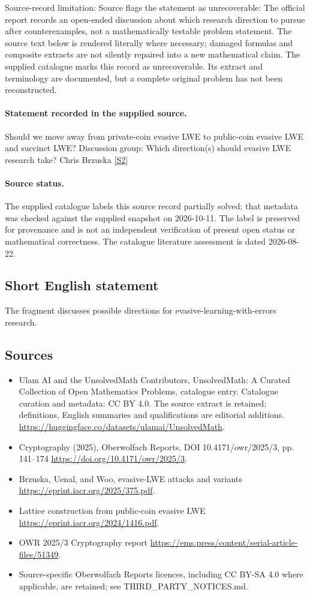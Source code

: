 \documentclass[11pt]{article}
\begin{document}
Source-record limitation: Source flags the statement as unrecoverable: The official report records an open-ended discussion about which research direction to pursue after counterexamples, not a mathematically testable problem statement.
The source text below is rendered literally where necessary; damaged formulas and composite extracts are not silently repaired into a new mathematical claim.
The supplied catalogue marks this record as unrecoverable. Its extract and terminology are documented, but a complete original problem has not been reconstructed.
\paragraph{Statement recorded in the supplied source.}
Should we move away from private-coin evasive LWE to public-coin evasive LWE and succinct LWE? Discussion group: Which direction(s) should evasive LWE research take? Chris Brzuska \href{https://doi.org/10.4171/owr/2025/3}{[S2]}
\paragraph{Source status.}
The supplied catalogue labels this source record partially solved; that metadata was checked against the supplied snapshot on 2026-10-11. The label is preserved for provenance and is not an independent verification of present open status or mathematical correctness. The catalogue literature assessment is dated 2026-08-22.
\subsection{Short English statement}
The fragment discusses possible directions for evasive-learning-with-errors research.
\subsection{Sources}
\begin{itemize}
\item[S1] Ulam AI and the UnsolvedMath Contributors, UnsolvedMath: A Curated Collection of Open Mathematics Problems, catalogue entry. Catalogue curation and metadata: CC BY 4.0. The source extract is retained; definitions, English summaries and qualifications are editorial additions.
\url{https://huggingface.co/datasets/ulamai/UnsolvedMath}.
\item[S2] Cryptography (2025), Oberwolfach Reports, DOI 10.4171/owr/2025/3, pp. 141--174
\url{https://doi.org/10.4171/owr/2025/3}.
\item[S3] Brzuska, Uenal, and Woo, evasive-LWE attacks and variants
\url{https://eprint.iacr.org/2025/375.pdf}.
\item[S4] Lattice construction from public-coin evasive LWE
\url{https://eprint.iacr.org/2024/1416.pdf}.
\item[S5] OWR 2025/3 Cryptography report
\url{https://ems.press/content/serial-article-files/51349}.
\item Source-specific Oberwolfach Reports licences, including CC BY-SA 4.0 where applicable, are retained; see THIRD\_PARTY\_NOTICES.md.
\end{itemize}
\end{document}
